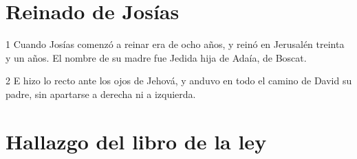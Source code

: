 \section*{Reinado de Josías}

\par 1 Cuando Josías comenzó a reinar era de ocho años, y reinó en Jerusalén treinta y un años. El nombre de su madre fue Jedida hija de Adaía, de Boscat.
\par 2 E hizo lo recto ante los ojos de Jehová, y anduvo en todo el camino de David su padre, sin apartarse a derecha ni a izquierda.

\section*{Hallazgo del libro de la ley}

